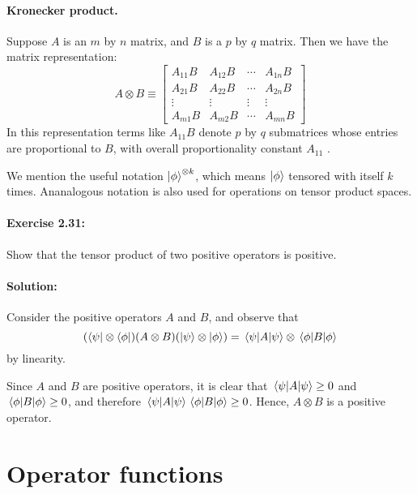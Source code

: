 \paragraph{Kronecker product.} Suppose $A$ is an $m$ by $n$ matrix, and $B$ is
a $p$ by $q$ matrix. Then we have the matrix representation: \begin{equation}
  A \otimes B \equiv \begin{bmatrix}
    A_{11}B & A_{12}B & \cdots & A_{1n}B \\
    A_{21}B & A_{22}B & \cdots & A_{2n}B \\
    \vdots & \vdots & \vdots & \vdots \\
    A_{m1}B & A_{m2}B & \cdots & A_{mn}B
  \end{bmatrix} \label{eq:kro-prod}
\end{equation}
In this representation terms like $A_{11}B$ denote $p$ by $q$ submatrices whose
entries are proportional to $B$, with overall proportionality constant $A_{11}$
.

We mention the useful notation $\ket{\phi}^{\otimes k}$, which means
$\ket{\phi}$ tensored with itself $k$ times. Ananalogous notation is also used
for operations on tensor product spaces.

\paragraph{\cite{mikeandike} Exercise 2.31:} Show that the tensor product of
two positive operators is positive.

\paragraph{Solution:} Consider the positive operators $A$ and $B$, and observe
that \begin{equation*}
  (\bra{\psi} \otimes \bra{\phi})(A \otimes B)(\ket{\psi} \otimes \ket{\phi})
    = \mel{\psi}{A}{\psi} \otimes \mel{\phi}{B}{\phi}
\end{equation*} by linearity.

Since $A$ and $B$ are positive operators, it is clear that $\mel{\psi}{A}{\psi}
\geq 0$ and $\mel{\phi}{B}{\phi} \geq 0$, and therefore $\mel{\psi}{A}{\psi}
\mel{\phi}{B}{\phi} \geq 0$. Hence, $A \otimes B$ is a positive operator.

\section{Operator functions}

